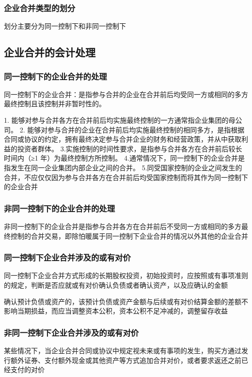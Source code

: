\documentclass[UTF8,12pt]{ctexart}
\numberwithin{equation}{section} %
\numberwithin{figure}{section}
\numberwithin{table}{section}
\begin{document}
	\subsubsection{企业合并类型的划分}
	划分主要分为同一控制下和非同一控制下
	
	\subsection{企业合并的会计处理}
	\subsubsection{同一控制下的企业合并的处理}
	同一控制下的企业合并：是指参与合并的企业在合并前后均受同一方或相同的多方最终控制且该控制并非暂时性的。
	
	1.	能够对参与合并各方在合并前后均实施最终控制的一方通常指企业集团的母公司。
	2.	能够对参与合并的企业在合并前后均实施最终控制的相同多方，是指根据合同或协议的约定，拥有最终决定参与合并企业的财务和经营政策，并从中获取利益的投资者群体。 
	3.实施控制的时间性要求，是指参与合并各方在合并前后较长时间内（≥1 年）为最终控制方所控制。
	4.通常情况下，同一控制下的企业合并是指发生在同一企业集团内部企业之间的合并。
	5.同受国家控制的企业之间发生的合并，不应仅仅因为参与合并各方在合并前后均受国家控制而将其作为同一控制下的企业合并
	
	\subsubsection{非同一控制下的企业合并的处理}
	非同一控制下的企业合并是指参与合并各方在合并前后不受同一方或相同的多方最终控制的合并交易，即除怕暖属于同一控制下企业合并的情况以外其他的企业合并
	
	\subsubsection{同一控制下企业合并涉及的或有对价}
	同一控制下企业合并方式形成的长期股权投资，初始投资时，应按照或有事项准则的规定，判断是否应就或有对价确认负债或者确认资产，以及应确认的金额
	
	确认预计负债或资产的，该预计负债或资产金额与后续或有对价结算金额的差额不影响当期损益，而应当调整资本公积，资本公积不足冲减的，调整留存收益
	\subsubsection{非同一控制下企业合并涉及的或有对价}
	某些情况下，当企业合并合同或协议中规定视未来或有事项的发生，购买方通过发行额外证券、支付额外现金或其他资产等方式追加合并对价，或者要求返还之前已经支付的对价
	
\end{document}
